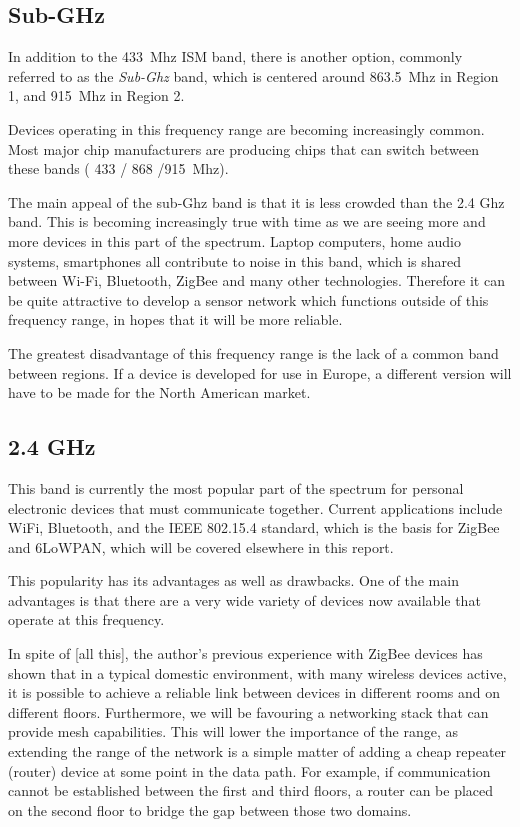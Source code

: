 
\subsection{Sub-GHz}

In addition to the \SI{433}{Mhz} \ac{ISM} band, there is another option,
commonly referred to as the \emph{Sub-Ghz} band, which is centered around
\SI{863.5}{Mhz} in Region 1, and \SI{915}{Mhz} in Region 2.

Devices operating in this frequency range are becoming increasingly common. Most
major chip manufacturers are producing chips that can switch between these bands
( 433 / 868 /\SI{915}{Mhz}).

The main appeal of the sub-Ghz band is that it is less crowded than the 2.4 Ghz
band. This is becoming increasingly true with time as we are seeing more and
more devices in this part of the spectrum. Laptop computers, home audio systems,
smartphones all contribute to noise in this band, which is shared between Wi-Fi,
Bluetooth, ZigBee and many other technologies. Therefore it can be quite
attractive to develop a sensor network which functions outside of this frequency
range, in hopes that it will be more reliable.

The greatest disadvantage of this frequency range is the lack of a common band
between regions. If a device is developed for use in Europe, a different version
will have to be made for the North American market.

\subsection{2.4 GHz}

This band is currently the most popular part of the spectrum for personal
electronic devices that must communicate together. Current applications include
WiFi, Bluetooth, and the IEEE 802.15.4 standard, which is the basis for ZigBee
and \ac{6LoWPAN}, which will be covered elsewhere in this report.

This popularity has its advantages as well as drawbacks. One of the main
advantages is that there are a very wide variety of devices now available that
operate at this frequency. 


In spite of [all this], the author's previous experience with ZigBee devices has
shown that in a typical domestic environment, with many wireless devices active,
it is possible to achieve a reliable link between devices in different rooms and
on different floors. Furthermore, we will be favouring a networking stack that
can provide mesh capabilities. This will lower the importance of the range, as
extending the range of the network is a simple matter of adding a cheap repeater
(router) device at some point in the data path. For example, if communication
cannot be established between the first and third floors, a router can be placed
on the second floor to bridge the gap between those two domains.


